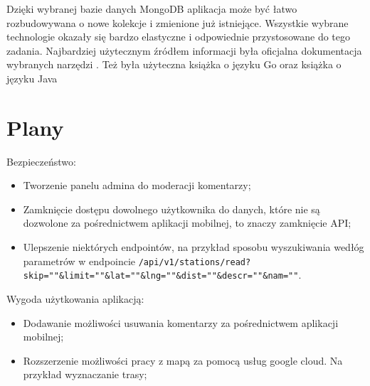 Dzięki wybranej bazie danych MongoDB aplikacja może być łatwo rozbudowywana o nowe kolekcje i zmienione już istniejące. Wszystkie wybrane technologie okazały się bardzo elastyczne i odpowiednie przystosowane do tego zadania.
Najbardziej użytecznym źródłem informacji była oficjalna dokumentacja wybranych narzędzi \cite{android_doc,godoc,golang2,mongoDB_doc}. Też była użyteczna książka o języku Go \cite{LearninGo} oraz książka o języku Java \cite{javabook}
%
\section{Plany}
\label{sec:plany}

Bezpieczeństwo:
\begin{itemize}
    \item Tworzenie panelu admina do moderacji komentarzy;
    \item Zamknięcie dostępu dowolnego użytkownika do danych, które nie są dozwolone za pośrednictwem aplikacji mobilnej, to znaczy zamknięcie API;
    \item Ulepszenie niektórych endpointów, na przykład sposobu wyszukiwania wedłóg parametrów w endpoincie \texttt{/api/v1/stations/read?skip=""\&limit=""\&lat=""\&lng=""\&dist=""\&descr=""\&nam=""}.
\end{itemize}
Wygoda użytkowania aplikacją:
\begin{itemize}
    \item Dodawanie możliwości usuwania komentarzy za pośrednictwem aplikacji mobilnej;
    \item Rozszerzenie możliwości pracy z mapą za pomocą usług google cloud. Na przykład wyznaczanie trasy;
\end{itemize}